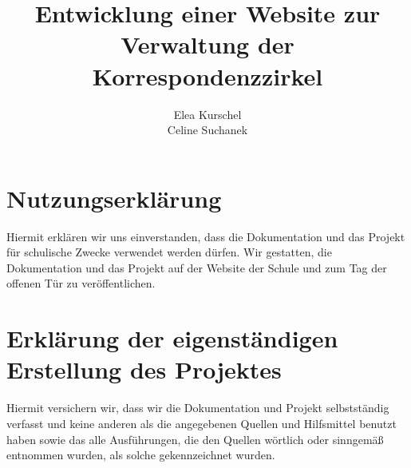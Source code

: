 \documentclass[11pt, oneside, halfparskip, smallheadings, automark]{scrreprt}
\title{Entwicklung einer Website zur Verwaltung der Korrespondenzzirkel}
\author{Elea Kurschel \\ Celine Suchanek}
\begin{document}
\maketitle

\tableofcontents










\listoffigures

\chapter*{Nutzungserklärung}
Hiermit erklären wir uns einverstanden, dass die Dokumentation und das Projekt für
schulische Zwecke verwendet werden dürfen.
Wir gestatten, die Dokumentation und das Projekt auf der Website der Schule und zum
Tag der offenen Tür zu veröffentlichen.

\chapter*{Erklärung der eigenständigen Erstellung des Projektes}
Hiermit versichern wir, dass wir die Dokumentation und Projekt selbstständig verfasst und
keine anderen als die angegebenen Quellen und Hilfsmittel benutzt haben sowie das alle
Ausführungen, die den Quellen wörtlich oder sinngemäß entnommen wurden, als solche
gekennzeichnet wurden.
\end{document}
